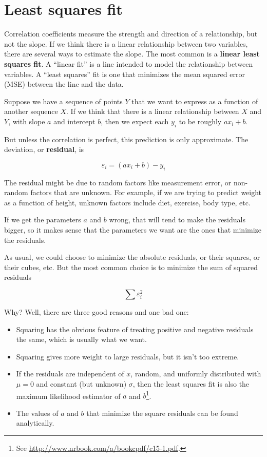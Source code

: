 \documentclass[12pt]{book}
\begin{document}
\section{Least squares fit}

Correlation coefficients measure the strength and direction of a
relationship, but not the slope.  If we think there is a linear
relationship between two variables, there are several ways to estimate
the slope.  The most common is a {\bf linear least squares fit}.  A
``linear fit'' is a line intended to model the relationship between
variables.  A ``least squares'' fit is one that minimizes the mean
squared error (MSE) between the line and the data.

Suppose we have a sequence of points $Y$ that we want to express
as a function of another sequence $X$.  If we think that there is
a linear relationship between $X$ and $Y$, with slope $a$ and
intercept $b$, then we expect each $y_i$ to be roughly $a x_i + b$.

But unless the correlation is perfect, this prediction is only
approximate.  The deviation, or {\bf residual}, is 

\newcommand{\eps}{\varepsilon}

\[ \eps_i = (a x_i + b) - y_i \]

The residual might be due to random factors like measurement error,
or non-random factors that are unknown.  For example, if we are
trying to predict weight as a function of height, unknown factors
include diet, exercise, body type, etc.

If we get the parameters $a$ and $b$ wrong, that will tend to make
the residuals bigger, so it makes sense that the parameters we want
are the ones that minimize the residuals.

As usual, we could choose to minimize the absolute residuals, or
their squares, or their cubes, etc.  But the most common choice
is to minimize the sum of squared residuals

\[ \sum \eps_i^2 \]

Why?  Well, there are three good reasons and one bad one:

\begin{itemize}

\item Squaring has the obvious feature of treating positive and
negative residuals the same, which is usually what we want.

\item Squaring gives more weight to large residuals, but it isn't
too extreme.

\item If the residuals are independent of $x$, random, and uniformly
  distributed with $\mu=0$ and constant (but unknown) $\sigma$, then
  the least squares fit is also the maximum likelihood estimator of
  $a$ and $b$\footnote{See
    \url{http://www.nrbook.com/a/bookcpdf/c15-1.pdf}.}.

\item The values of $a$ and $b$ that minimize the square residuals can
  be found analytically.

\end{itemize}
\end{document}
